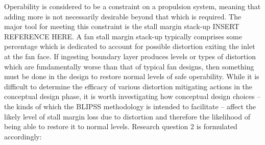 				Operability is considered to be a constraint on a propulsion system, meaning that adding more is not necessarily desirable beyond that which is required.  The major tool for meeting this constraint is the stall margin stack-up INSERT REFERENCE HERE.  A fan stall margin stack-up typically comprises some percentage which is dedicated to account for possible distortion exiting the inlet at the fan face.  If ingesting boundary layer produces levels or types of distortion which are fundamentally worse than that of typical fan designs, then something must be done in the design to restore normal levels of safe operability.  While it is difficult to determine the efficacy of various distortion mitigating actions in the conceptual design phase, it is worth investigating how conceptual design choices -- the kinds of which the BLIPSS methodology is intended to facilitate -- affect the likely level of stall margin loss due to distortion and therefore the likelihood of being able to restore it to normal levels.  Research question 2 is formulated accordingly:
				\vspace{1pt}
				\vspace{5mm}
	
